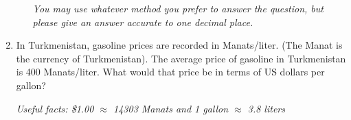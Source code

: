 \documentclass[12pt]{article}
\begin{document}
\begin{enumerate}
\begin{enumerate}
\emph{You may use whatever method you prefer to answer the question, but please give an answer accurate to one decimal place.}
\vfill

\end{enumerate}

\noindent \hrulefill
\item In Turkmenistan, gasoline prices are recorded in Manats/liter.  (The Manat is the currency of Turkmenistan).  The average price of gasoline in Turkmenistan is 400 Manats/liter.  What would that price be in terms of US dollars per gallon?

\emph{Useful facts:  \$1.00 $\approx$ 14303 Manats and 1 gallon $\approx$ 3.8 liters }
\vfill


\end{enumerate}



\end{document}
